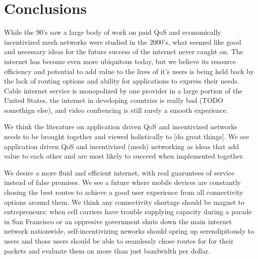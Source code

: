 \section{Conclusions}
While the 90's saw a large body of work on paid QoS and economically incentivized mesh networks were studied in the 2000's, what seemed like good and necessary ideas for the future success of the internet never caught on.
The internet has become even more ubiquitous today, but we believe its resource efficiency and potential to add value to the lives of it's users is being held back by the lack of routing options and ability for applications to express their needs.
Cable internet service is monopolized by one provider in a large portion of the United States, the internet in developing countries is really bad (TODO somethign else), and video confrencing is still rarely a smooth experience.

We think the literature on application driven QoS and incentivized networks needs to be brought together and viewed holistically to [do great things]. We see application driven QoS and incentivized (mesh) networking as ideas that add value to each other and are most likely to succeed when implemented together.

We desire a more fluid and efficient internet, with real guaruntees of service instead of false promises. We see a future where mobile devices are constantly chosing the best routes to achieve a good user experience from all connectivity options around them.
We think any connectivity shortage should be magnet to entrepreneurs: when cell carriers have trouble supplying capacity during a parade in San Francisco or an oppresive government shuts down the main internet network nationwide, self-incentivizing neworks should spring up serendipitously to users and those users should be able to seamlessly chose routes for for their packets and evaluate them on more than just bandwidth per dollar.





\label{sec:conc}
